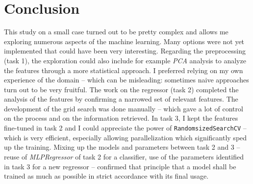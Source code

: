\documentclass[11pt]{article}
\begin{document}
\section{Conclusion}

    This study on a small case turned out to be pretty complex and allows me exploring numerous aspects of the machine learning. Many options were not yet implemented that could have been very interesting. Regarding the preprocessing (task 1), the exploration could also include for example \emph{PCA} analysis to analyze the features through a more statistical approach. I preferred relying on my own experience of the domain -- which can be misleading: sometimes naive approaches turn out to be very fruitful. The work on the regressor (task 2) completed the analysis of the features by confirming a narrowed set of relevant features. The development of the grid search was done manually -- which gave a lot of control on the process and on the information retrieved. In task 3, I kept the features fine-tuned in task 2 and I could appreciate the power of \texttt{RandomsizedSearchCV} -- which is very efficient, especially allowing parallelization which significantly sped up the training. Mixing up the models and parameters between task 2 and 3  -- reuse of \emph{MLPRegressor} of task 2 for a classifier, use of the parameters identified in task 3 for a new regressor -- confirmed that principle that a model shall be trained as much as possible in strict accordance with its final usage.
\end{document}

